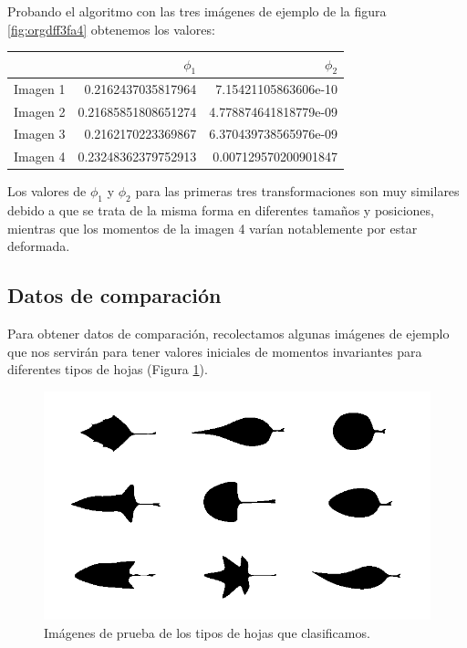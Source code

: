 \documentclass[letter]{article}
\begin{document}
Probando el algoritmo con las tres imágenes de ejemplo de la figura \ref{fig:orgdff3fa4} obtenemos
los valores:

\begin{center}
\begin{tabular}{lrr}
 & \(\phi_1\) & \(\phi_2\)\\
\hline
Imagen 1 & 0.2162437035817964 & 7.15421105863606e-10\\
Imagen 2 & 0.21685851808651274 & 4.778874641818779e-09\\
Imagen 3 & 0.2162170223369867 & 6.370439738565976e-09\\
Imagen 4 & 0.23248362379752913 & 0.007129570200901847\\
\end{tabular}
\end{center}

Los valores de \(\phi_1\) y \(\phi_2\) para las primeras tres transformaciones son
muy similares debido a que se trata de la misma forma en diferentes tamaños y
posiciones, mientras que los momentos de la imagen 4 varían notablemente por
estar deformada.

\subsection{Datos de comparación}
\label{sec:org661711f}
Para obtener datos de comparación, recolectamos algunas imágenes de ejemplo que
nos servirán para tener valores iniciales de momentos invariantes para
diferentes tipos de hojas (Figura \ref{fig:orge93e56a}).

\begin{figure}[htbp]
\centering
\includegraphics[width=.9\linewidth]{./images/leaves.png}
\caption{\label{fig:orge93e56a}Imágenes de prueba de los tipos de hojas que clasificamos.}
\end{figure}
\end{document}
